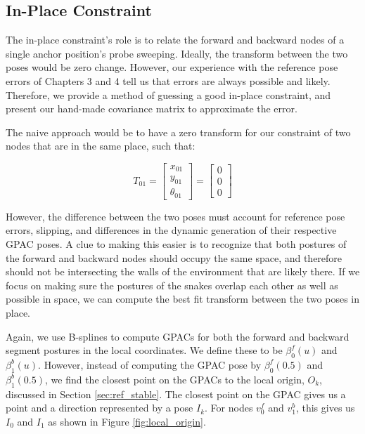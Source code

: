 \subsection{In-Place Constraint}

The in-place constraint's role is to relate the forward and backward nodes of a single anchor position's probe sweeping.  Ideally, the transform between the two poses would be zero change.  However, our experience with the reference pose errors of Chapters 3 and 4 tell us that errors are always possible and likely.  Therefore, we provide a method of guessing a good in-place constraint, and present our hand-made covariance matrix to approximate the error. 

The naive approach would be to have a zero transform for our constraint of two nodes that are in the same place, such that:

\begin{equation}
T_{01} = 
\begin{bmatrix}
x_{01} \\
y_{01} \\
\theta_{01}
\end{bmatrix}
= 
\begin{bmatrix}
0 \\
0 \\
0
\end{bmatrix}
\end{equation}


However, the difference between the two poses must account for reference pose errors, slipping, and differences in the dynamic generation of their respective GPAC poses.  A clue to making this easier is to recognize that both postures of the forward and backward nodes should occupy the same space, and therefore should not be intersecting the walls of the environment that are likely there.  If we focus on making sure the postures of the snakes overlap each other as well as possible in space, we can compute the best fit transform between the two poses in place.

Again, we use B-splines to compute GPACs for both the forward and backward segment postures in the local coordinates.  We define these to be $\beta_0^f(u)$ and $\beta_1^b(u)$. However, instead of computing the GPAC pose by $\beta_0^f(0.5)$ and $\beta_1^b(0.5)$, we find the closest point on the GPACs to the local origin, $O_k$, discussed in Section \ref{sec:ref_stable}.  The closest point on the GPAC gives us a point and a direction represented by a pose $I_k$.  For nodes $v^f_0$ and $v^b_1$, this gives us $I_0$ and $I_1$ as shown in Figure \ref{fig:local_origin}.

